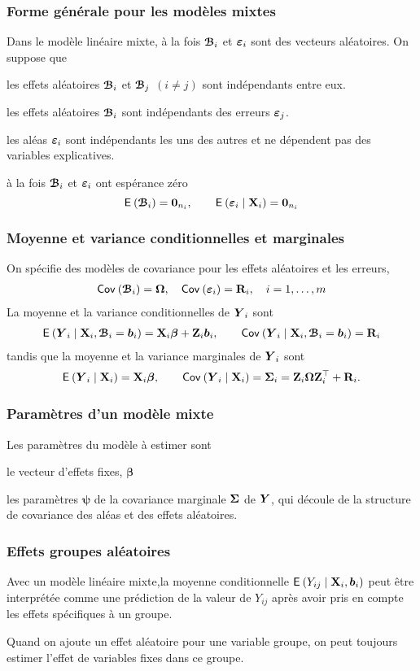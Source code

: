 \documentclass{beamer}
\begin{document}
\begin{frame}
\frametitle{Forme générale pour les modèles mixtes}
Dans le modèle linéaire mixte, à la fois $\boldsymbol {\mathcal{B}}_i$ et $\boldsymbol {\varepsilon}_i$ sont des vecteurs aléatoires. On suppose que 
\bi
\item les effets aléatoires $\boldsymbol {\mathcal{B}}_i$ et $\boldsymbol {\mathcal{B}}_j$ $(i \neq j)$ sont indépendants entre eux.
\item les effets aléatoires $\boldsymbol {\mathcal{B}}_i$ sont indépendants des erreurs $\boldsymbol {\varepsilon}_j$.
\item les aléas $\boldsymbol {\varepsilon}_i$ sont indépendants les uns des autres et ne dépendent pas des variables explicatives.
\item à la fois $\boldsymbol {\mathcal{B}}_i$ et $\boldsymbol {\varepsilon}_i$ ont espérance zéro \[{\mathsf E}_{}\left(\boldsymbol {\mathcal{B}}_i\right)=\boldsymbol {0}_{n_i}, \qquad {\mathsf E}_{}\left(\boldsymbol {\varepsilon}_i \mid \mathbf{X}_i\right)=\boldsymbol {0}_{n_i}\]
\ei
\end{frame}
\begin{frame}
\frametitle{Moyenne et variance conditionnelles et marginales}
On spécifie des modèles de covariance pour les effets aléatoires et les erreurs,
\begin{align*}
{\mathsf{Cov}_{}}\left(\boldsymbol {\mathcal{B}}_i\right)=\boldsymbol {\Omega}, \quad {\mathsf{Cov}_{}}\left(\boldsymbol {\varepsilon}_i\right)=\mathbf{R}_i, \quad i=1, \ldots, m
\end{align*}
La moyenne et la variance \alert{conditionnelles} de $\boldsymbol {Y}_i$ sont
\begin{align*}
{\mathsf E}_{}\left(\boldsymbol {Y}_i \mid \mathbf{X}_i,\boldsymbol {\mathcal{B}}_i=\boldsymbol {b}_i\right) = \mathbf{X}_i \boldsymbol {\beta} + \mathbf{Z}_i \boldsymbol {b}_i, \qquad {\mathsf{Cov}_{}}\left(\boldsymbol {Y}_i \mid \mathbf{X}_i, \boldsymbol {\mathcal{B}}_i=\boldsymbol {b}_i\right) = \mathbf{R}_i
\end{align*}
tandis que la moyenne et la variance \alert{marginales} de $\boldsymbol {Y}_i$ sont
\begin{align*}
{\mathsf E}_{}\left(\boldsymbol {Y}_i \mid \mathbf{X}_i\right) = \mathbf{X}_i \boldsymbol {\beta}, \qquad {\mathsf{Cov}_{}}\left(\boldsymbol {Y}_i \mid \mathbf{X}_i\right) = \boldsymbol {\Sigma}_i=\mathbf{Z}_i \boldsymbol {\Omega}\mathbf{Z}_i^\top+\mathbf{R}_i.
\end{align*}
\end{frame}
\begin{frame}[fragile]
\frametitle{Paramètres d'un modèle mixte}
Les \alert{paramètres} du modèle à estimer sont
\bi \item le vecteur d'effets fixes, $\boldsymbol{\beta}$
\item les paramètres $\boldsymbol{\psi}$ de la covariance marginale $\boldsymbol {\Sigma}$ de $\boldsymbol {Y}$, qui découle de la structure de covariance  des aléas et des effets aléatoires.
\ei

\end{frame}
\begin{frame}
\frametitle{Effets groupes aléatoires}
\bi
\item Avec un modèle linéaire mixte,la moyenne conditionnelle ${\mathsf E}_{}\left(Y_{ij}\mid \mathbf{X}_i, \boldsymbol {b}_i\right)$  peut être interprétée comme une \alert{prédiction} de la valeur de $Y_{ij}$ après avoir pris en compte les effets spécifiques à un groupe.
\item Quand on ajoute un effet aléatoire pour une variable groupe, on peut toujours estimer l'effet de variables fixes dans ce groupe.
\ei
\end{frame}
\end{document}
